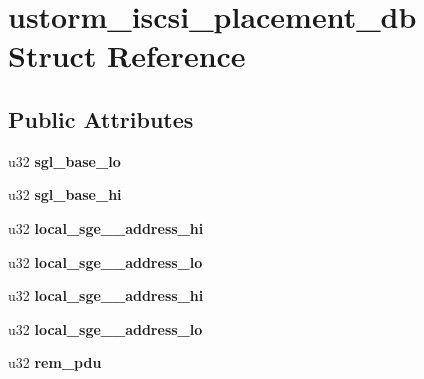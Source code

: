 \hypertarget{structustorm__iscsi__placement__db}{
\section{ustorm\_\-iscsi\_\-placement\_\-db Struct Reference}
\label{structustorm__iscsi__placement__db}
}
\subsection*{Public Attributes}
\begin{DoxyCompactItemize}
\item 
\hypertarget{structustorm__iscsi__placement__db_a1dafd57a077c5ec202f4998e7df91f4f}{
u32 {\bfseries sgl\_\-base\_\-lo}}
\label{structustorm__iscsi__placement__db_a1dafd57a077c5ec202f4998e7df91f4f}

\item 
\hypertarget{structustorm__iscsi__placement__db_aafb73856499fe8374e8a92452499cc89}{
u32 {\bfseries sgl\_\-base\_\-hi}}
\label{structustorm__iscsi__placement__db_aafb73856499fe8374e8a92452499cc89}

\item 
\hypertarget{structustorm__iscsi__placement__db_a74ad16c5a7b078089444ad4481df4756}{
u32 {\bfseries local\_\-sge\_\_\-address\_\-hi}}
\label{structustorm__iscsi__placement__db_a74ad16c5a7b078089444ad4481df4756}

\item 
\hypertarget{structustorm__iscsi__placement__db_a1af5c7bbc2c077a670b32aff39f29895}{
u32 {\bfseries local\_\-sge\_\_\-address\_\-lo}}
\label{structustorm__iscsi__placement__db_a1af5c7bbc2c077a670b32aff39f29895}

\item 
\hypertarget{structustorm__iscsi__placement__db_a9314462ec0352e38a620bcc967ba03f3}{
u32 {\bfseries local\_\-sge\_\_\-address\_\-hi}}
\label{structustorm__iscsi__placement__db_a9314462ec0352e38a620bcc967ba03f3}

\item 
\hypertarget{structustorm__iscsi__placement__db_ac3049ec85254b4e36b665b92b4c19708}{
u32 {\bfseries local\_\-sge\_\_\-address\_\-lo}}
\label{structustorm__iscsi__placement__db_ac3049ec85254b4e36b665b92b4c19708}

\item 
\hypertarget{structustorm__iscsi__placement__db_a0218b90f0a74c2a5d2165c3a252348e9}{
u32 {\bfseries rem\_\-pdu}}
\label{structustorm__iscsi__placement__db_a0218b90f0a74c2a5d2165c3a252348e9}


\end{DoxyCompactItemize}
